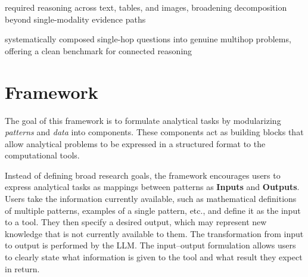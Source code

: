 \documentclass[sigconf,nonacm,anonymous]{acmart}
\begin{document}
\cite{talmor2021multimodalqa} required reasoning across text, tables, and images, broadening decomposition beyond single-modality evidence paths

\cite{trivedi-etal-2022-musique} systematically composed single-hop questions into genuine multihop problems, offering a clean benchmark for connected reasoning

\section{Framework}
\label{sec:framework}

The goal of this framework is to formulate analytical tasks by modularizing \textit{patterns} and \textit{data} into components. These components act as building blocks that allow analytical problems to be expressed in a structured format to the computational tools.

Instead of defining broad research goals, the framework encourages users to
express analytical tasks as mappings between patterns as \textbf{Inputs} and \textbf{Outputs}.
Users take the information currently available, such as mathematical definitions of multiple patterns, examples of a single pattern, etc., and define it as the input to a tool. They then specify a desired output, which may represent new knowledge that is not currently available to them. The transformation from input to output is performed by the LLM. The input–output formulation allows users to clearly state what information is given to the tool and what result they expect in return.
\end{document}
